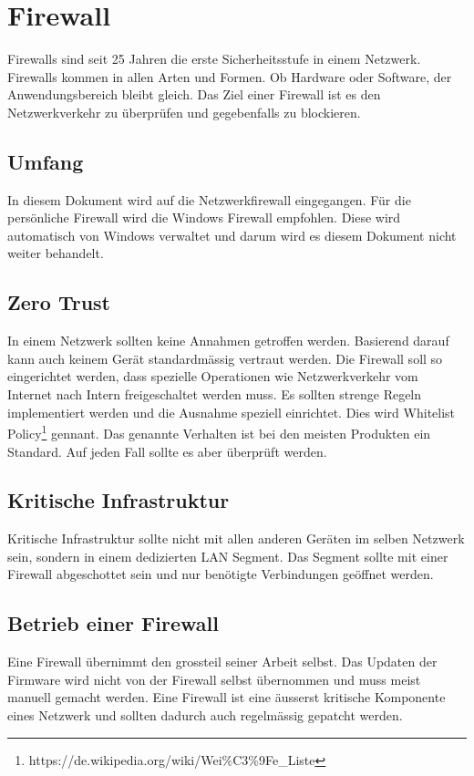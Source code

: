 \chapter{Firewall}
Firewalls sind seit 25 Jahren die erste Sicherheitsstufe in einem Netzwerk.
Firewalls kommen in allen Arten und Formen.
Ob Hardware oder Software, der Anwendungsbereich bleibt gleich.
Das Ziel einer Firewall ist es den Netzwerkverkehr zu überprüfen und gegebenfalls zu blockieren.


\section{Umfang}
In diesem Dokument wird auf die Netzwerkfirewall eingegangen.
Für die persönliche Firewall wird die Windows Firewall empfohlen.
Diese wird automatisch von Windows verwaltet und darum wird es diesem Dokument nicht weiter behandelt.

\section{Zero Trust}
In einem Netzwerk sollten keine Annahmen getroffen werden.
Basierend darauf kann auch keinem Gerät standardmässig vertraut werden.
Die Firewall soll so eingerichtet werden, dass spezielle Operationen wie Netzwerkverkehr vom Internet nach Intern freigeschaltet werden muss.
Es sollten strenge Regeln implementiert werden und die Ausnahme speziell einrichtet.
Dies wird Whitelist Policy\footnote{https://de.wikipedia.org/wiki/Wei\%C3\%9Fe\_Liste} gennant.
Das genannte Verhalten ist bei den meisten Produkten ein Standard.
Auf jeden Fall sollte es aber überprüft werden.

\section{Kritische Infrastruktur}
Kritische Infrastruktur sollte nicht mit allen anderen Geräten im selben Netzwerk sein, sondern in einem dedizierten LAN Segment.
Das Segment sollte mit einer Firewall abgeschottet sein und nur benötigte Verbindungen geöffnet werden.

\section{Betrieb einer Firewall}
Eine Firewall übernimmt den grossteil seiner Arbeit selbst.
Das Updaten der Firmware wird nicht von der Firewall selbst übernommen und muss meist manuell gemacht werden.
Eine Firewall ist eine äusserst kritische Komponente eines Netzwerk und sollten dadurch auch regelmässig gepatcht werden.\\

